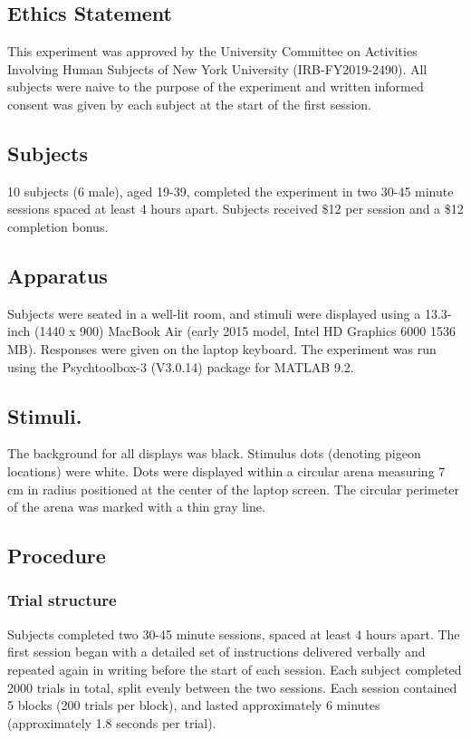 \documentclass{article}
\begin{document}
\subsection*{Ethics Statement}
This experiment was approved by the University Committee on Activities Involving Human Subjects of New York University (IRB-FY2019-2490). All subjects were naive to the purpose of the experiment and written informed consent was given by each subject at the start of the first session.

\subsection*{Subjects}
10 subjects (6 male), aged 19-39, completed the experiment in two 30-45 minute sessions spaced at least 4 hours apart. Subjects received \$12 per session and a \$12 completion bonus. 

\subsection*{Apparatus} Subjects were seated in a well-lit room, and stimuli were displayed using a 13.3-inch (1440 x 900) MacBook Air (early 2015 model, Intel HD Graphics 6000 1536 MB). Responses were given on the laptop keyboard. The experiment was run using the Psychtoolbox-3 (V3.0.14) package for MATLAB 9.2.
\subsection*{Stimuli.} The background for all displays was black. Stimulus dots (denoting pigeon locations) were white. Dots were displayed within a circular arena measuring 7 cm in radius positioned at the center of the laptop screen. The circular perimeter of the arena was marked with a thin gray line.

\subsection*{Procedure}
\subsubsection*{Trial structure}  Subjects completed two 30-45 minute sessions, spaced at least 4 hours apart. The first session began with a detailed set of instructions delivered verbally and repeated again in writing before the start of each session. Each subject completed 2000 trials in total, split evenly between the two sessions. Each session contained 5 blocks (200 trials per block), and lasted approximately 6 minutes (approximately 1.8 seconds per trial).
\end{document}

